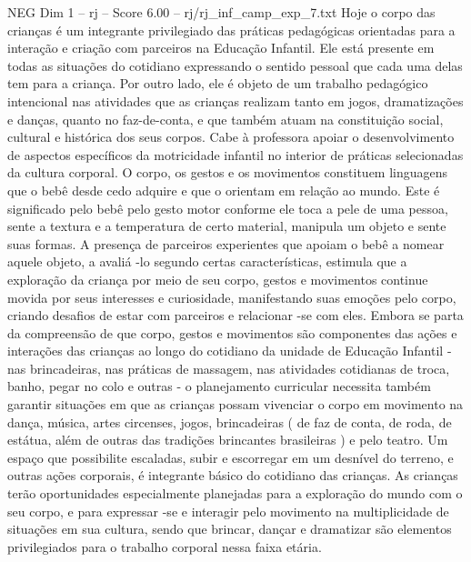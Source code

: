 \begin{textsample}{NEG Dim 1 – rj – Score 6.00 – rj/rj\_inf\_camp\_exp\_7.txt}
Hoje o corpo das crianças é um integrante privilegiado das práticas pedagógicas orientadas para a interação e criação com parceiros na Educação Infantil.
Ele está presente em todas as situações do cotidiano expressando o sentido pessoal que cada uma delas tem para a criança.
Por outro lado, ele é objeto de um trabalho pedagógico intencional nas atividades que as crianças realizam tanto em jogos, dramatizações e danças, quanto no faz-de-conta, e que também atuam na constituição social, cultural e histórica dos seus corpos.
Cabe à professora apoiar o desenvolvimento de aspectos específicos da motricidade infantil no interior de práticas selecionadas da cultura corporal.
O corpo, os gestos e os movimentos constituem linguagens que o bebê desde cedo adquire e que o orientam em relação ao mundo.
Este é significado pelo bebê pelo gesto motor conforme ele toca a pele de uma pessoa, sente a textura e a temperatura de certo material, manipula um objeto e sente suas formas.
A presença de parceiros experientes que apoiam o bebê a nomear aquele objeto, a avaliá -lo segundo certas características, estimula que a exploração da criança por meio de seu corpo, gestos e movimentos continue movida por seus interesses e curiosidade, manifestando suas emoções pelo corpo, criando desafios de estar com parceiros e relacionar -se com eles.
Embora se parta da compreensão de que corpo, gestos e movimentos são componentes das ações e interações das crianças ao longo do cotidiano da unidade de Educação Infantil - nas brincadeiras, nas práticas de massagem, nas atividades cotidianas de troca, banho, pegar no colo e outras - o planejamento curricular necessita também garantir situações em que as crianças possam vivenciar o corpo em movimento na dança, música, artes circenses, jogos, brincadeiras ( de faz de conta, de roda, de estátua, além de outras das tradições brincantes brasileiras ) e pelo teatro.
Um espaço que possibilite escaladas, subir e escorregar em um desnível do terreno, e outras ações corporais, é integrante básico do cotidiano das crianças.
As crianças terão oportunidades especialmente planejadas para a exploração do mundo com o seu corpo, e para expressar -se e interagir pelo movimento na multiplicidade de situações em sua cultura, sendo que brincar, dançar e dramatizar são elementos privilegiados para o trabalho corporal nessa faixa etária.

\end{textsample}

